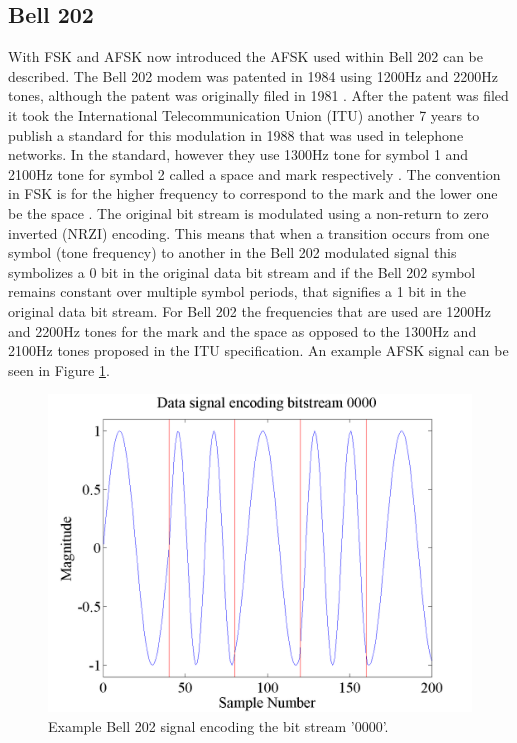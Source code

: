 \subsection{Bell 202}
With FSK and AFSK now introduced the AFSK used within Bell 202 can be described. The Bell 202 modem was patented in 1984 using 1200Hz and 2200Hz tones, although the patent was originally filed in 1981 \cite{stauffer1984fsk}. After the patent was filed it took the International Telecommunication Union (ITU) another 7 years to publish a standard for this modulation in 1988 that was used in telephone networks. In the standard, however they use 1300Hz tone for symbol 1 and 2100Hz tone for symbol 2 called a space and mark respectively \cite{ITUV23}. The convention in FSK is for the higher frequency to correspond to the mark and the lower one be the space \cite{Watson 1980}. The original bit stream is modulated using a non-return to zero inverted (NRZI) encoding. This means that when a transition occurs from one symbol (tone frequency) to another in the Bell 202 modulated signal this symbolizes a 0 bit in the original data bit stream and if the Bell 202 symbol remains constant over multiple symbol periods, that signifies a 1 bit in the original data bit stream. For Bell 202 the frequencies that are used are 1200Hz and 2200Hz tones for the mark and the space as opposed to the 1300Hz and 2100Hz tones proposed in the ITU specification. An example AFSK signal can be seen in Figure \ref{exampleBitStream}.
\begin{figure}
  \centering
	\includegraphics[width=0.75\linewidth]{images/Datasignalencodingbitstream0000.png} 
	\caption{Example Bell 202 signal encoding the bit stream '0000'.}
	\label{exampleBitStream}
\end{figure}
